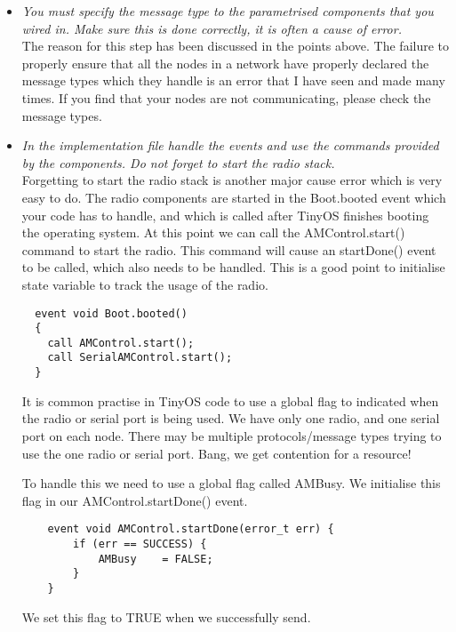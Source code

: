 \documentclass [a4] {article}
\begin{document}
\begin{itemize}
\item \textit{You must specify the message type to the parametrised components that you wired in. Make sure this is done correctly, it is often a cause of error.}
\linebreak
\\
The reason for this step has been discussed in the points above. The failure to properly ensure that all the nodes in a network have properly declared the message types which they handle is an error that I have seen and made many times. If you find that your nodes are not communicating, please check the message types.

\item \textit{In the implementation file handle the events and use the commands provided by the components. Do not forget to start the radio stack.}
\linebreak
\\
Forgetting to start the radio stack is another major cause error which is very easy to do. The radio components are started in the Boot.booted event which your code has to handle, and which is called after TinyOS finishes booting the operating system. At this point we can call the AMControl.start() command to start the radio. This command will cause an startDone() event to be called, which also needs to be handled. This is a good point to initialise state variable to track the usage of the radio.

\begin{verbatim}
  event void Boot.booted()
  {
    call AMControl.start();
    call SerialAMControl.start();
  }
\end{verbatim}

It is common practise in TinyOS code to use a global flag to indicated when the radio or serial port is being used. We have only one radio, and one serial port on each node. There may be multiple protocols/message types trying to use the one radio or serial port. Bang, we get contention for a resource!

To handle this we need to use a global flag called AMBusy. We initialise this flag in our AMControl.startDone() event.

\begin{verbatim}
    event void AMControl.startDone(error_t err) {
        if (err == SUCCESS) {
            AMBusy    = FALSE;
        }
    } 
\end{verbatim}

We set this flag to TRUE when we successfully send.


\end{itemize}
\end{document}
